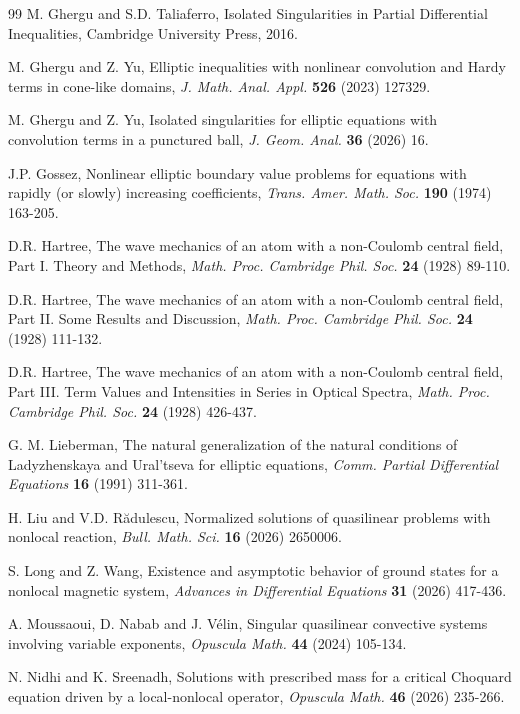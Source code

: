 \documentclass[leqno,12pt]{article}
\numberwithin{equation}{section}
\begin{document}
\begin{thebibliography}{99}
 M. Ghergu and S.D. Taliaferro,  Isolated Singularities in Partial Differential Inequalities, Cambridge University Press, 2016.

 M. Ghergu and Z. Yu, Elliptic inequalities with nonlinear convolution and Hardy terms in cone-like domains, {\it J. Math. Anal. Appl.} {\bf 526} (2023) 127329.

 M. Ghergu and Z. Yu, Isolated singularities for elliptic equations with convolution terms in a punctured ball, {\it J. Geom. Anal.} {\bf 36} (2026) 16.

 J.P. Gossez, Nonlinear elliptic boundary value problems for equations with rapidly (or slowly) increasing coefficients, {\it Trans. Amer. Math. Soc.} {\bf 190} (1974) 163-205.


 D.R. Hartree, The wave mechanics of an atom with a non-Coulomb central field, Part I. Theory and Methods, {\it Math.  Proc. Cambridge Phil. Soc.} {\bf 24} (1928) 89-110. 

 D.R. Hartree, The wave mechanics of an atom with a non-Coulomb central field, Part II. Some Results and Discussion, {\it Math.  Proc. Cambridge Phil. Soc.} {\bf 24} (1928) 111-132. 

 D.R. Hartree, The wave mechanics of an atom with a non-Coulomb central field, Part III. Term Values and Intensities in Series in Optical Spectra, {\it Math.  Proc. Cambridge Phil. Soc.} {\bf 24} (1928) 426-437.

 G. M. Lieberman, The natural generalization of the natural conditions of Ladyzhenskaya and Ural’tseva for
elliptic equations, {\it Comm. Partial Differential Equations} {\bf 16} (1991) 311-361.

 H. Liu and V.D. R\u adulescu, Normalized solutions of quasilinear problems
with nonlocal reaction, {\it  Bull. Math. Sci.}  {\bf  16} (2026) 2650006. 

 S. Long and Z. Wang, Existence and asymptotic behavior of ground states for a nonlocal magnetic system, {\it Advances in Differential Equations} {\bf 31} (2026) 417-436.

 A. Moussaoui, D. Nabab and J. V\'elin, Singular quasilinear convective systems involving variable exponents, {\it Opuscula Math.} {\bf 44} (2024) 105-134.

 N. Nidhi and K. Sreenadh, Solutions with prescribed mass 
for a critical Choquard equation driven by a local-nonlocal operator, 
{\it Opuscula Math.} {\bf 46} (2026) 235-266.


\end{thebibliography}
\end{document}
